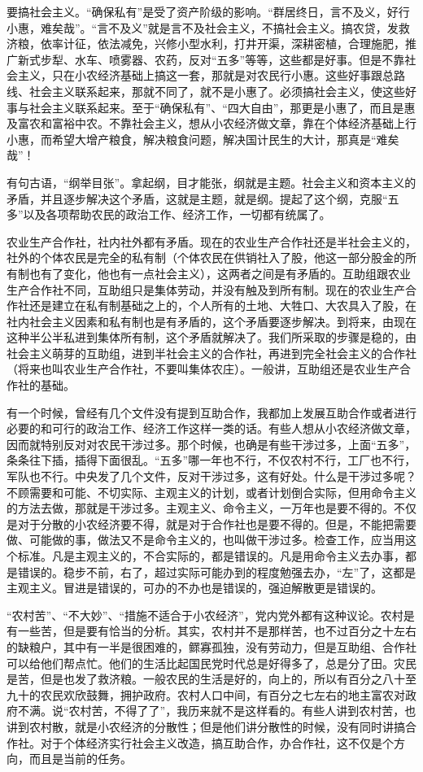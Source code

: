 要搞社会主义。“确保私有”是受了资产阶级的影响。“群居终日，言不及义，好行小惠，难矣哉”。“言不及义”就是言不及社会主义，不搞社会主义。搞农贷，发救济粮，依率计征，依法减免，兴修小型水利，打井开渠，深耕密植，合理施肥，推广新式步犁、水车、喷雾器、农药，反对“五多”等等，这些都是好事。但是不靠社会主义，只在小农经济基础上搞这一套，那就是对农民行小惠。这些好事跟总路线、社会主义联系起来，那就不同了，就不是小惠了。必须搞社会主义，使这些好事与社会主义联系起来。至于“确保私有”、“四大自由”，那更是小惠了，而且是惠及富农和富裕中农。不靠社会主义，想从小农经济做文章，靠在个体经济基础上行小惠，而希望大增产粮食，解决粮食问题，解决国计民生的大计，那真是“难矣哉”！

有句古语，“纲举目张”。拿起纲，目才能张，纲就是主题。社会主义和资本主义的矛盾，并且逐步解决这个矛盾，这就是主题，就是纲。提起了这个纲，克服“五多”以及各项帮助农民的政治工作、经济工作，一切都有统属了。

农业生产合作社，社内社外都有矛盾。现在的农业生产合作社还是半社会主义的，社外的个体农民是完全的私有制（个体农民在供销社入了股，他这一部分股金的所有制也有了变化，他也有一点社会主义），这两者之间是有矛盾的。互助组跟农业生产合作社不同，互助组只是集体劳动，并没有触及到所有制。现在的农业生产合作社还是建立在私有制基础之上的，个人所有的土地、大牲口、大农具入了股，在社内社会主义因素和私有制也是有矛盾的，这个矛盾要逐步解决。到将来，由现在这种半公半私进到集体所有制，这个矛盾就解决了。我们所采取的步骤是稳的，由社会主义萌芽的互助组，进到半社会主义的合作社，再进到完全社会主义的合作社（将来也叫农业生产合作社，不要叫集体农庄）。一般讲，互助组还是农业生产合作社的基础。

有一个时候，曾经有几个文件没有提到互助合作，我都加上发展互助合作或者进行必要的和可行的政治工作、经济工作这样一类的话。有些人想从小农经济做文章，因而就特别反对对农民干涉过多。那个时候，也确是有些干涉过多，上面“五多”，条条往下插，插得下面很乱。“五多”哪一年也不行，不仅农村不行，工厂也不行，军队也不行。中央发了几个文件，反对干涉过多，这有好处。什么是干涉过多呢？不顾需要和可能、不切实际、主观主义的计划，或者计划倒合实际，但用命令主义的方法去做，那就是干涉过多。主观主义、命令主义，一万年也是要不得的。不仅是对于分散的小农经济要不得，就是对于合作社也是要不得的。但是，不能把需要做、可能做的事，做法又不是命令主义的，也叫做干涉过多。检查工作，应当用这个标准。凡是主观主义的，不合实际的，都是错误的。凡是用命令主义去办事，都是错误的。稳步不前，右了，超过实际可能办到的程度勉强去办，“左”了，这都是主观主义。冒进是错误的，可办的不办也是错误的，强迫解散更是错误的。

“农村苦”、“不大妙”、“措施不适合于小农经济”，党内党外都有这种议论。农村是有一些苦，但是要有恰当的分析。其实，农村并不是那样苦，也不过百分之十左右的缺粮户，其中有一半是很困难的，鳏寡孤独，没有劳动力，但是互助组、合作社可以给他们帮点忙。他们的生活比起国民党时代总是好得多了，总是分了田。灾民是苦，但是也发了救济粮。一般农民的生活是好的，向上的，所以有百分之八十至九十的农民欢欣鼓舞，拥护政府。农村人口中间，有百分之七左右的地主富农对政府不满。说“农村苦，不得了了”，我历来就不是这样看的。有些人讲到农村苦，也讲到农村散，就是小农经济的分散性；但是他们讲分散性的时候，没有同时讲搞合作社。对于个体经济实行社会主义改造，搞互助合作，办合作社，这不仅是个方向，而且是当前的任务。

